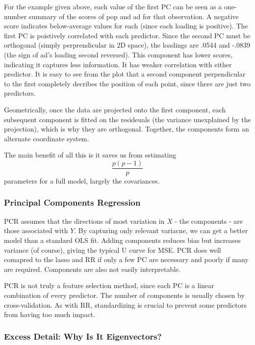 \documentclass[
]{article}
\begin{document}
For the example given above, each value of the first PC can be seen as a
one-number summary of the scores of pop and ad for that observation. A
negative score indicates below-average values for each (since each
loading is positive). The first PC is poistively correlated with each
predictor. Since the second PC must be orthogonal (simply perprendicular
in 2D space), the loadings are .0544 and -.0839 (the sign of ad's
loading second reversed). This component has lower scores, indicating it
captures less information. It has weaker correlation with either
predictor. It is easy to see from the plot that a second component
perpendicular to the first completely decribes the position of each
point, since there are just two predictors.

Geometrically, once the data are projected onto the first component,
each subsequent component is fitted on the resideuals (the variance
unexplained by the projection), which is why they are orthogonal.
Together, the components form an alternate coordinate system.

The main benefit of all this is it saves us from estimating
\[\frac{p(p-1)}{p}\] parameters for a full model, largely the
covariances.

\hypertarget{principal-components-regression}{%
\subsubsection{Principal Components
Regression}\label{principal-components-regression}}

PCR assumes that the directions of most variation in \(X\) - the
components - are those associated with \(Y\). By capturing only relevant
variacne, we can get a better model than a standard OLS fit. Adding
components reduces bias but increases variance (of course), giving the
typical U curve for MSE. PCR does well comapred to the lasso and RR if
only a few PC are necessary and poorly if many are required. Components
are also not easily interpretable.

PCR is not truly a feature selection method, since each PC is a linear
combination of every predictor. The number of components is usually
chosen by cross-validation. As with RR, standardizing is crucial to
prevent some predictors from having too much impact.

\hypertarget{excess-detail-why-is-it-eigenvectors}{%
\subsubsection{Excess Detail: Why Is It
Eigenvectors?}\label{excess-detail-why-is-it-eigenvectors}}
\end{document}
